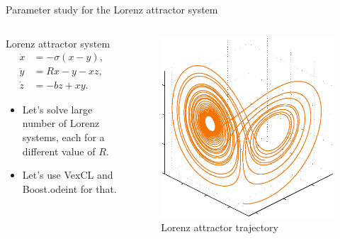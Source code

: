 \documentclass[@BEAMER_OPTIONS@]{beamer}
\begin{document}
\begin{frame}[fragile]{Parameter study for the Lorenz attractor system}
    \begin{columns}
        \begin{column}{0.6\textwidth}
            \begin{block}{Lorenz attractor system}
                \vspace{-1\baselineskip}
                \begin{align*}
                    \dot{x} &= -\sigma \left( x - y \right), \\
                    \dot{y} &= R x - y - xz, \\
                    \dot{z} &= -bz + xy.
                    \label{eq:lorenz}
                \end{align*}
            \end{block}
            \begin{itemize}
                \item Let's solve large number of Lorenz systems, each
                    for a different value of $R$.
                \item Let's use VexCL and Boost.odeint for that.
            \end{itemize}
        \end{column}
        \begin{column}{0.4\textwidth}
            \begin{figure}
                \includegraphics[width=\textwidth]{lorenz}
                \caption{Lorenz attractor trajectory}
            \end{figure}
        \end{column}
    \end{columns}
\end{frame}
\end{document}
